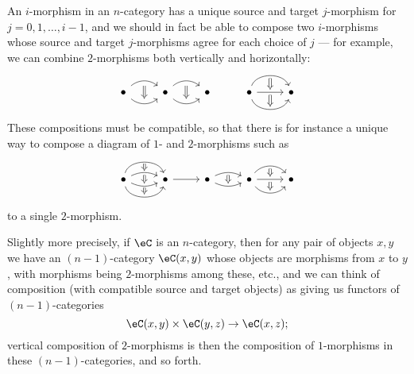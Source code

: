 \documentclass[a4paper,12pt]{article}
\begin{document}
An $i$-morphism in an $n$-category has a unique source and target
$j$-morphism for $j = 0,1,\dots,i-1$, and we should in fact be able to
compose two $i$-morphisms whose source and target $j$-morphisms agree
for each choice of $j$ --- for example, we can combine $2$-morphisms both
vertically and horizontally:
  \[
    \begin{tikzcd}
      \bullet \ar[r, bend left=40, ""{below,name=A,inner sep=2pt}]
      \ar[r, bend right=40, ""{above,name=B,inner sep=2pt}] & \bullet
      \ar[r, bend left=40, ""{below,name=C,inner sep=2pt}]
      \ar[r, bend right=40, ""{above,name=D,inner sep=2pt}] & \bullet
      \ar[from=A, to=B, Rightarrow]
      \ar[from=C, to=D, Rightarrow]
      &  \bullet \ar[r, bend left=70, ""{below,name=E,inner sep=1pt}]
      \arrow[r, ""{above,name=F,inner sep=1pt}, ""{below,name=G,inner
        sep=1pt}]
      \ar[r, bend right=70, ""{above,name=H,inner sep=1pt}]
      & \bullet
      \ar[from=E, to=F, Rightarrow]
      \ar[from=G, to=H, Rightarrow]      
    \end{tikzcd}
  \]
These compositions must be compatible, so that there is for instance a
unique way to compose a diagram of $1$- and $2$-morphisms such as
\[
\begin{tikzcd}
  \bullet 
  \ar[r, bend left=75, ""{below,name=A,inner sep=0.5pt}] 
  \ar[r, bend left=25, ""{name=B1,inner sep=0.5pt},
  ""{name=B2,below,inner sep=1pt}] 
  \ar[r, bend right=25, ""{name=C1,inner sep=1pt}, ""{below,name=C2,inner sep=0.5pt}] 
  \ar[r, bend right=75, ""{name=D,inner sep=1pt}] &
  \bullet 
  \ar[r]  &
  \bullet 
  \ar[r, bend left=25, ""{below,name=E,inner sep=1pt}] 
  \ar[r, bend right=25, ""{name=F,inner sep=1pt}] &
  \bullet 
  \ar[r, bend left=50, ""{below,name=G,inner sep=1pt}] 
  \ar[r, ""{name=H1,inner sep=1pt}, ""{name=H2,below,inner sep=1pt}] 
  \ar[r, bend right=50, ""{name=I,inner sep=1pt}] &
  \bullet
  \arrow[from=A,to=B1,Rightarrow]
  \arrow[from=B2,to=C1,Rightarrow]
  \arrow[from=C2,to=D,Rightarrow]
  \arrow[from=E,to=F,Rightarrow]
  \arrow[from=G,to=H1,Rightarrow]
  \arrow[from=H2,to=I,Rightarrow]
\end{tikzcd}
\]  
to a single $2$-morphism.

Slightly more precisely, if $\eC$ is an $n$-category, then for any pair of objects $x,y$ we
have an $(n-1)$-category $\eC(x,y)$ whose objects are morphisms from
$x$ to $y$, with morphisms being $2$-morphisms among these, etc., and we
can think of composition (with compatible source and target objects) as giving us functors of $(n-1)$-categories
\[ \eC(x,y) \times \eC(y,z)\to \eC(x,z);\] vertical composition of $2$-morphisms is then the composition of
$1$-morphisms in these $(n-1)$-categories, and so forth.
\end{document}
